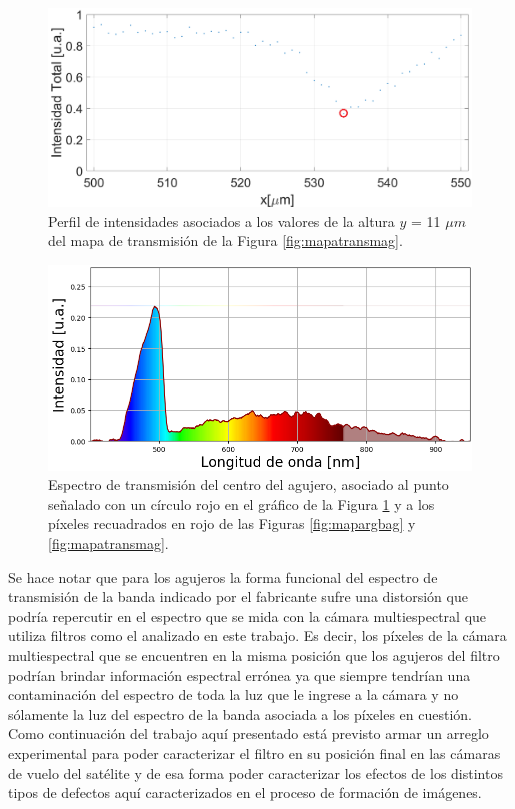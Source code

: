  \begin{figure}[H]
	\centering
	\includegraphics[width=1.0\textwidth]{Figs/microespectrometro/perfilbackag.png}
	\caption{Perfil de intensidades asociados a los valores de la altura $\textit{y}$ = 11 $\mu m$ del mapa de transmisión de la Figura \ref{fig:mapatransmag}.}
	\label{fig:perfilbacka}
\end{figure}

 \begin{figure}[H]
	\centering
	\includegraphics[scale=0.8]{Figs/microespectrometro/espectroagback.png}
	\caption{Espectro de transmisión del centro del agujero, asociado al punto señalado con un círculo rojo en el gráfico de la Figura \ref{fig:perfilbacka} y a los píxeles recuadrados en rojo de las Figuras \ref{fig:mapargbag} y \ref{fig:mapatransmag}.}
	\label{fig:espectbag}
\end{figure}

Se hace notar que para los agujeros la forma funcional del espectro de transmisión de la banda indicado por el fabricante sufre una distorsión que podría repercutir en el espectro que se mida con la cámara multiespectral que utiliza filtros como el analizado en este trabajo. Es decir, los píxeles de la cámara multiespectral que se encuentren en la misma posición que los agujeros del filtro podrían brindar información espectral errónea ya que siempre tendrían una contaminación del espectro de toda la luz que le ingrese a la cámara y no sólamente la luz del espectro de la banda asociada a los píxeles en cuestión. Como continuación del trabajo aquí presentado está previsto armar un arreglo experimental para poder caracterizar el filtro en su posición final en las cámaras de vuelo del satélite y de esa forma poder caracterizar los efectos de los distintos tipos de defectos aquí caracterizados en el proceso de formación de imágenes.






